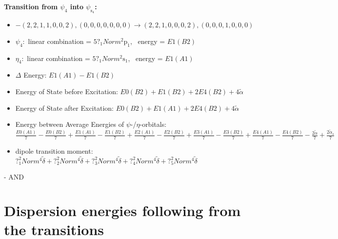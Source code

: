 \documentclass[12pt,a4paper]{article}
\begin{document}
        \noindent\textbf{Transition from $\psi_{4}$ into $\psi_{\text{s}_{4}}$:}
        \begin{itemize}
            \item $- (2, 2, 1, 1, 0, 0, 2), (0, 0, 0, 0, 0, 0, 0) \rightarrow (2, 2, 1, 0, 0, 0, 2), (0, 0, 0, 1, 0, 0, 0)$
        
            \item $\psi_{4}:$ linear combination = $5 ?_{1} Norm^{2} \text{p}_{1}$, \
            energy = $E1(B2)$
            
            \item $\eta_{4}:$ linear combination = $5 ?_{1} Norm^{2} \text{s}_{1}$, \
            energy = $E1(A1)$
            
                \item $\Delta$ Energy: $E1(A1) - E1(B2)$
                \item Energy of State before Excitation: $E0(B2) + E1(B2) + 2 E4(B2) + 4 \tilde{\alpha}$
                \item Energy of State after Excitation: $E0(B2) + E1(A1) + 2 E4(B2) + 4 \tilde{\alpha}$
                \item Energy between Average Energies of $\psi$-/$\eta$-orbitals: $\frac{E0(A1)}{7} - \frac{E0(B2)}{7} + \frac{E1(A1)}{7} - \frac{E1(B2)}{7} + \frac{E2(A1)}{7} - \frac{E2(B2)}{7} + \frac{E3(A1)}{7} - \frac{E3(B2)}{7} + \frac{E4(A1)}{7} - \frac{E4(B2)}{7} - \frac{2 \tilde{\alpha}}{7} + \frac{2 \tilde{\alpha}_{s}}{7}$
            
            \item dipole transition moment: $?_{1}^{2} Norm^{4} \tilde{\delta} + ?_{2}^{2} Norm^{4} \tilde{\delta} + ?_{3}^{2} Norm^{4} \tilde{\delta} + ?_{4}^{2} Norm^{4} \tilde{\delta} + ?_{5}^{2} Norm^{4} \tilde{\delta}$
        
        \end{itemize}
        
 -  AND 
\newpage \section*{Dispersion energies following from the transitions}
\end{document}
